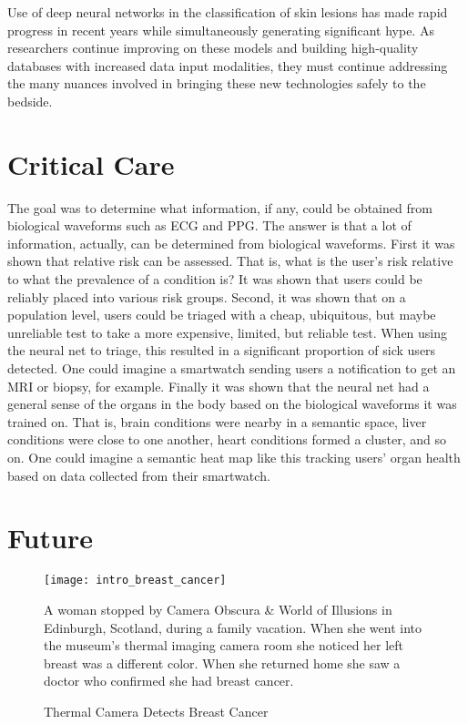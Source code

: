 Use of deep neural networks in the classification of skin lesions has made rapid progress in recent years while simultaneously generating significant hype. As researchers continue improving on these models and building high-quality databases with increased data input modalities, they must continue addressing the many nuances involved in bringing these new technologies safely to the bedside.

\section{Critical Care}

The goal was to determine what information, if any, could be obtained from biological waveforms such as ECG and PPG.  The answer is that a lot of information, actually, can be determined from biological waveforms.  First it was shown that relative risk can be assessed.  That is, what is the user's risk relative to what the prevalence of a condition is?  It was shown that users could be reliably placed into various risk groups.  Second, it was shown that on a population level, users could be triaged with a cheap, ubiquitous, but maybe unreliable test to take a more expensive, limited, but reliable test.  When using the neural net to triage, this resulted in a significant proportion of sick users detected.  One could imagine a smartwatch sending users a notification to get an MRI or biopsy, for example.  Finally it was shown that the neural net had a general sense of the organs in the body based on the biological waveforms it was trained on.  That is, brain conditions were nearby in a semantic space, liver conditions were close to one another, heart conditions formed a cluster, and so on.  One could imagine a semantic heat map like this tracking users' organ health based on data collected from their smartwatch.

\section{Future}

\begin{figure}
\begin{center}
    \texttt{[image: intro\_breast\_cancer]}
\end{center}
\caption{Thermal Camera Detects Breast Cancer}
\vspace{12px}
A woman stopped by Camera Obscura \& World of Illusions in Edinburgh, Scotland, during a family vacation. When she went into the museum's thermal imaging camera room she noticed her left breast was a different color. When she returned home she saw a doctor who confirmed she had breast cancer.
\vspace{12px}
\label{fig:intro_breast_cancer}
\end{figure}

